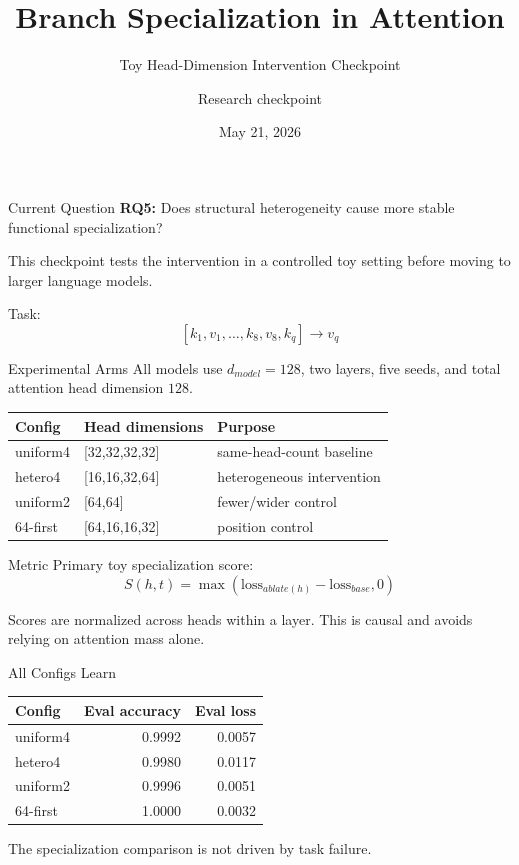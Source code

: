 \documentclass[aspectratio=169]{beamer}
\title{Branch Specialization in Attention}
\subtitle{Toy Head-Dimension Intervention Checkpoint}
\author{Research checkpoint}
\date{May 21, 2026}
\begin{document}
\begin{frame}
  \titlepage
\end{frame}

\begin{frame}{Current Question}
  \textbf{RQ5:} Does structural heterogeneity cause more stable functional
  specialization?

  \vspace{0.7em}
  This checkpoint tests the intervention in a controlled toy setting before
  moving to larger language models.

  \vspace{0.7em}
  Task:
  \[
    [k_1,v_1,\ldots,k_8,v_8,k_q] \rightarrow v_q
  \]
\end{frame}

\begin{frame}{Experimental Arms}
  All models use \(d_{model}=128\), two layers, five seeds, and total attention
  head dimension \(128\).

  \begin{table}
    \centering
    \begin{tabular}{lll}
      \toprule
      Config & Head dimensions & Purpose \\
      \midrule
      uniform4 & [32,32,32,32] & same-head-count baseline \\
      hetero4 & [16,16,32,64] & heterogeneous intervention \\
      uniform2 & [64,64] & fewer/wider control \\
      64-first & [64,16,16,32] & position control \\
      \bottomrule
    \end{tabular}
  \end{table}
\end{frame}

\begin{frame}{Metric}
  Primary toy specialization score:
  \[
    S(h,t)=\max(\mathrm{loss}_{ablate(h)}-\mathrm{loss}_{base},0)
  \]

  \vspace{0.7em}
  Scores are normalized across heads within a layer. This is causal and avoids
  relying on attention mass alone.
\end{frame}

\begin{frame}{All Configs Learn}
  \begin{table}
    \centering
    \begin{tabular}{lrr}
      \toprule
      Config & Eval accuracy & Eval loss \\
      \midrule
      uniform4 & 0.9992 & 0.0057 \\
      hetero4 & 0.9980 & 0.0117 \\
      uniform2 & 0.9996 & 0.0051 \\
      64-first & 1.0000 & 0.0032 \\
      \bottomrule
    \end{tabular}
  \end{table}

  The specialization comparison is not driven by task failure.
\end{frame}
\end{document}
